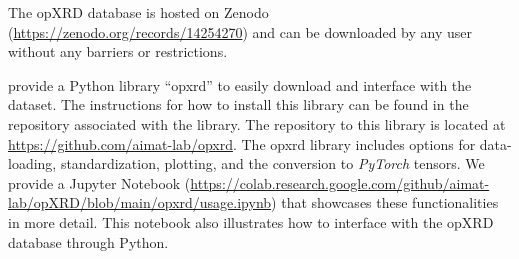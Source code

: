 The opXRD database is hosted on Zenodo (\url{https://zenodo.org/records/14254270}) and can be downloaded by any user without any barriers or restrictions.

 provide a Python library ``opxrd'' to easily download and interface with the dataset. The instructions for how to install this library can be found in the repository associated with the library. The repository to this library is located at \url{https://github.com/aimat-lab/opxrd}. The opxrd library includes options for data-loading, standardization, plotting, and the conversion to \emph{PyTorch} tensors. We provide a Jupyter Notebook (\url{https://colab.research.google.com/github/aimat-lab/opXRD/blob/main/opxrd/usage.ipynb})
that showcases these functionalities in more detail. This notebook also illustrates how to interface with the opXRD database through Python. 